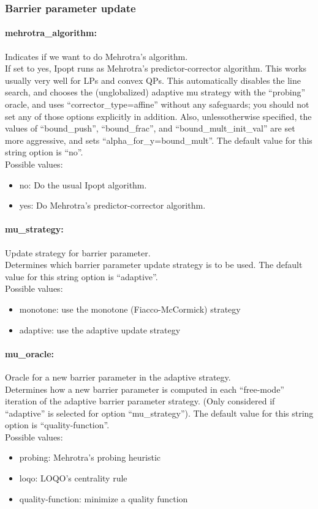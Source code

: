 \subsubsection{Barrier parameter update}

\paragraph{mehrotra\_algorithm:} Indicates if we want to do Mehrotra's algorithm. $\;$ \\
 If set to yes, Ipopt runs as Mehrotra's
predictor-corrector algorithm. This works usually
very well for LPs and convex QPs.  This
automatically disables the line search, and
chooses the (unglobalized) adaptive mu strategy
with the ``probing'' oracle, and uses
``corrector\_type=affine'' without any safeguards;
you should not set any of those options
explicitly in addition.  Also, unlessotherwise
specified, the values of ``bound\_push'',
``bound\_frac'', and ``bound\_mult\_init\_val'' are
set more aggressive, and sets
``alpha\_for\_y=bound\_mult''.
The default value for this string option is ``no''.
\\ 
Possible values:
\begin{itemize}
   \item no: Do the usual Ipopt algorithm.
   \item yes: Do Mehrotra's predictor-corrector algorithm.
\end{itemize}

\paragraph{mu\_strategy:} Update strategy for barrier parameter. $\;$ \\
 Determines which barrier parameter update
strategy is to be used.
The default value for this string option is ``adaptive''.
\\ 
Possible values:
\begin{itemize}
   \item monotone: use the monotone (Fiacco-McCormick) strategy
   \item adaptive: use the adaptive update strategy
\end{itemize}

\paragraph{mu\_oracle:} Oracle for a new barrier parameter in the adaptive strategy. $\;$ \\
 Determines how a new barrier parameter is
computed in each ``free-mode'' iteration of the
adaptive barrier parameter strategy. (Only
considered if ``adaptive'' is selected for option
``mu\_strategy'').
The default value for this string option is ``quality-function''.
\\ 
Possible values:
\begin{itemize}
   \item probing: Mehrotra's probing heuristic
   \item loqo: LOQO's centrality rule
   \item quality-function: minimize a quality function
\end{itemize}

